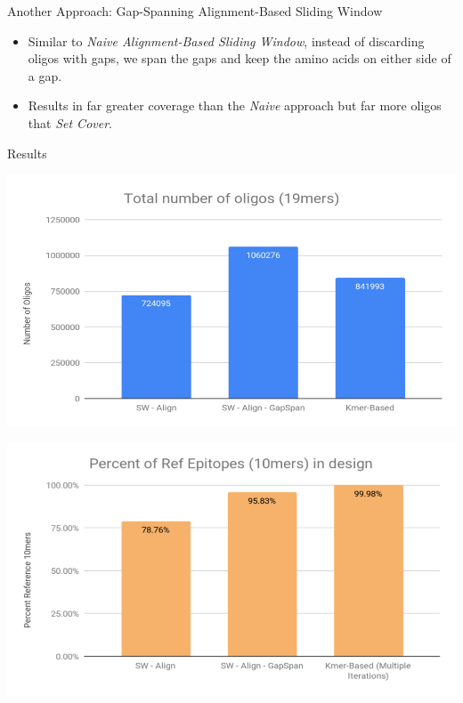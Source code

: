 \documentclass[final]{beamer}
\newlength{\colwidth}
\begin{document}
\begin{frame}[t]
\begin{columns}[t]
\begin{column}{\colwidth}
\begin{block}{Another Approach: Gap-Spanning Alignment-Based Sliding Window}
    \begin{itemize}
    \item Similar to \emph{Naive Alignment-Based Sliding Window}, instead of discarding oligos with gaps,
          we span the gaps and keep the amino acids on either side of a gap.
      \item Results in far greater coverage than the \emph{Naive} approach but far more oligos that \emph{Set Cover}.
    \end{itemize}
  \end{block}

  \begin{block}{Results}
    \begin{minipage}[t]{0.5\colwidth}
        \includegraphics[width=0.5\colwidth,height=15\baselineskip]{figures/total_num_oligos.png}
    \end{minipage}%
    \begin{minipage}[t]{0.5\colwidth}
      \includegraphics[width=0.5\colwidth,height=15\baselineskip]{figures/percent_ref_epis.png}
    \end{minipage}
  \end{block}


\end{column}
\end{columns}
\end{frame}
\end{document}

